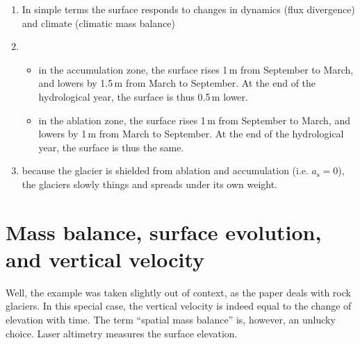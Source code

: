 \documentclass[DIV15,11pt,parskip=half]{scrartcl}
\begin{document}
\begin{enumerate}
\item In simple terms the surface responds to changes in dynamics (flux divergence) and climate (climatic mass balance)
\item
\begin{itemize}
\item in the accumulation zone, the surface rises 1\,m from September to March, and lowers by 1.5\,m from March to September. At the end of the hydrological year, the surface is thus 0.5\,m lower.
\item in the ablation zone, the surface rises 1\,m from September to March, and lowers by 1\,m from March to September. At the end of the hydrological year, the surface is thus the same.
\end{itemize}


\item because the glacier is shielded from ablation and accumulation (i.e. $a_{\textrm{s}} =0$), the glaciers slowly things and spreads under its own weight.
\end{enumerate}


\section{Mass balance, surface evolution, and vertical velocity}

Well, the example was taken slightly out of context, as the paper deals with rock glaciers. In this special case, the vertical velocity is indeed equal to the change of elevation with time. The term ``spatial mass balance'' is, however, an unlucky choice. Laser altimetry measures the surface elevation.
\end{document}
